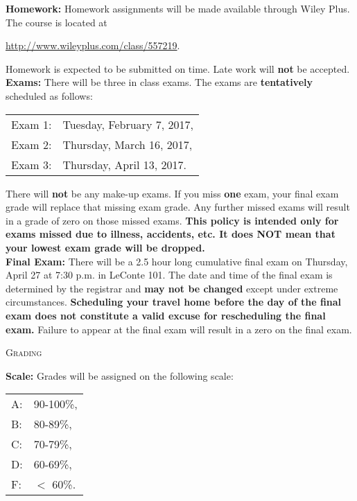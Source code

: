 \documentclass[teaching.portfolio.tex]{subfiles}
\begin{document}
\noindent
\textbf{Homework:} 
Homework assignments will be made available through Wiley Plus.
The course is located at
\begin{center}
  \url{http://www.wileyplus.com/class/557219}.
\end{center}
Homework is expected to be submitted on time.
Late work will \textbf{not} be accepted.\\

\noindent
\textbf{Exams:} 
There will be three in class exams.
The exams are \textbf{tentatively} scheduled as follows:
\begin{center}
  \begin{tabular}{ll}
    Exam 1: & Tuesday, February 7, 2017,\\
    Exam 2: & Thursday, March 16, 2017,\\
    Exam 3: & Thursday, April 13, 2017.
  \end{tabular}
\end{center}
\noindent
There will \textbf{not} be any make-up exams.
If you miss \textbf{one} exam, your final exam grade will replace that missing exam grade.
Any further missed exams will result in a grade of zero on those missed exams.
\textbf{This policy is intended only for exams missed due to illness, accidents, etc.  
  It does NOT mean that your lowest exam grade will be dropped.}\\

\noindent
\textbf{Final Exam:} 
There will be a 2.5 hour long cumulative final exam on Thursday, April 27 at 7:30 p.m. in LeConte 101.
The date and time of the final exam is determined by the registrar and \textbf{may not be changed} except under extreme circumstances.
\textbf{Scheduling your travel home before the day of the final exam does not constitute a valid excuse for rescheduling the final exam.}
Failure to appear at the final exam will result in a zero on the final exam.

\begin{center}
  \textsc{Grading}
\end{center}

\noindent
\textbf{Scale:} 
Grades will be assigned on the following scale:
\begin{center}
  \begin{tabular}{ll}
    A: &90-100\%,\\
    B: & 80-89\%,\\
    C: & 70-79\%,\\
    D: & 60-69\%,\\
    F: & $<$ 60\%.\\
  \end{tabular}
\end{center}
\end{document}

